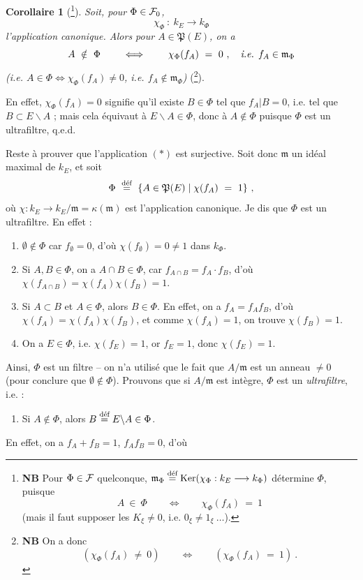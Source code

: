 \noindent\textbf{Corollaire 1} (\footnote[204]{\textbf{NB} Pour $\Phi\in\cF$ quelconque, $\mathfrak{m}_\Phi\defeq\Ker(\chi_\Phi : k_E\longrightarrow k_\Phi)$ détermine $\Phi$, puisque
\[
A \ \in \ \Phi \qquad\iff\qquad \chi_\Phi(f_A) \ = \ 1
\]
(mais il faut supposer les $K_\xi\neq0$, i.e. $0_\xi\neq1_\xi\ \ldots$).}). \textit{Soit, pour $\Phi\in\cF_0$,}
\[
\chi_\Phi \ : \ k_E \longrightarrow k_\Phi
\]
\textit{l'application canonique. Alors pour $A\in\mathfrak{P}(E)$, on a}
\[
A \ \notin \ \Phi \qquad\iff\qquad \chi_\Phi(f_A) \ = \ 0 \ , \quad \text{\textit{i.e.} } f_A\in\mathfrak{m}_\Phi
\]
\textit{(i.e. $A\in\Phi\iff\chi_\Phi(f_A)\neq0$, i.e. $f_A\notin\mathfrak{m}_\Phi$)} (\footnote[205]{\textbf{NB} On a donc
\[
(\chi_\Phi(f_A) \ \neq \ 0) \qquad\iff\qquad (\chi_\Phi(f_A) \ = \ 1) \ .
\]}).

\noindent En effet, $\chi_\Phi(f_A)=0$ signifie qu'il existe $B\in\Phi$ tel que $f_A|B=0$, i.e. tel que $B\subset E\backslash A$ ; mais cela équivaut à $E\backslash A\in\Phi$, donc à $A\notin\Phi$ puisque $\Phi$ est un ultrafiltre, q.e.d.

\noindent Reste à prouver que l'application $(*)$ est surjective. Soit donc $\mathfrak{m}$ un idéal maximal de $k_E$, et soit
\[
\Phi \ \defeq \ \{A\in\mathfrak{P}(E)\mid\chi(f_A) \ = \ 1\} \ ,
\]
où $\chi : k_E\longrightarrow k_E/\mathfrak{m}=\kappa(\mathfrak{m})$ est l'application canonique. Je dis que $\Phi$ est un ultrafiltre. En effet :
\begin{enumerate}
\item[a)] $\emptyset\notin\Phi$ car $f_\emptyset=0$, d'où $\chi(f_\emptyset)=0\neq1$ dans $k_\Phi$.
\item[b)] Si $A,B\in\Phi$, on a $A\cap B\in\Phi$, car $f_{A\cap B}=f_A\cdot f_B$, d'où $\chi(f_{A\cap B})=\chi(f_A)\chi(f_B)=1$.
\item[c)] Si $A\subset B$ et $A\in\Phi$, alors $B\in\Phi$. En effet, on a $f_A=f_Af_B$, d'où $\chi(f_A)=\chi(f_A)\chi(f_B)$, et comme $\chi(f_A)=1$, on trouve $\chi(f_B)=1$.
\item[d)] On a $E\in\Phi$, i.e. $\chi(f_E)=1$, or $f_E=1$, donc $\chi(f_E)=1$.
\end{enumerate}
Ainsi, $\Phi$ est un filtre -- on n'a utilisé que le fait que $A/\mathfrak{m}$ est un anneau $\neq0$ (pour conclure que $\emptyset\notin\Phi$). Prouvons que si $A/\mathfrak{m}$ est intègre, $\Phi$ est un \textit{ultrafiltre}, i.e. :
\begin{enumerate}
\item[e)] Si $A\notin\Phi$, alors $B\defeq E\backslash A\in\Phi$.
\end{enumerate}
En effet, on a $f_A+f_B=1$, $f_Af_B=0$, d'où

